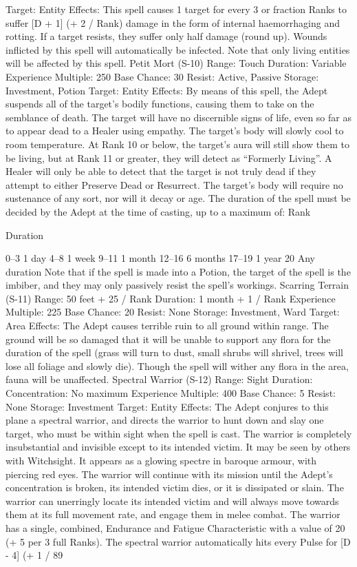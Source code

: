 \documentclass[a4paper]{article}
\begin{document}
\begin{multicols}{3}
Target: Entity
Effects: This spell causes 1 target for every 3 or
fraction Ranks to suffer [D + 1] (+ 2 / Rank) damage in the form of internal haemorrhaging and
rotting. If a target resists, they suffer only half
damage (round up). Wounds inflicted by this spell
will automatically be infected.
Note that only living entities will be affected by
this spell.
Petit Mort (S-10)
Range: Touch
Duration: Variable
Experience Multiple: 250
Base Chance: 30%
Resist: Active, Passive
Storage: Investment, Potion
Target: Entity
Effects: By means of this spell, the Adept suspends
all of the target’s bodily functions, causing them to
take on the semblance of death. The target will
have no discernible signs of life, even so far as to
appear dead to a Healer using empathy. The target’s body will slowly cool to room temperature.
At Rank 10 or below, the target’s aura will still
show them to be living, but at Rank 11 or greater,
they will detect as “Formerly Living”. A Healer
will only be able to detect that the target is not
truly dead if they attempt to either Preserve Dead
or Resurrect. The target’s body will require no
sustenance of any sort, nor will it decay or age. The
duration of the spell must be decided by the Adept
at the time of casting, up to a maximum of:
Rank

Duration

0–3
1 day
4–8
1 week
9–11
1 month
12–16 6 months
17–19 1 year
20
Any duration
Note that if the spell is made into a Potion, the
target of the spell is the imbiber, and they may only
passively resist the spell’s workings.
Scarring Terrain (S-11)
Range: 50 feet + 25 / Rank
Duration: 1 month + 1 / Rank
Experience Multiple: 225
Base Chance: 20%
Resist: None
Storage: Investment, Ward
Target: Area
Effects: The Adept causes terrible ruin to all
ground within range. The ground will be so damaged that it will be unable to support any flora for
the duration of the spell (grass will turn to dust,
small shrubs will shrivel, trees will lose all foliage
and slowly die). Though the spell will wither any
flora in the area, fauna will be unaffected.
Spectral Warrior (S-12)
Range: Sight
Duration: Concentration: No maximum
Experience Multiple: 400
Base Chance: 5%
Resist: None
Storage: Investment
Target: Entity
Effects: The Adept conjures to this plane a spectral
warrior, and directs the warrior to hunt down and
slay one target, who must be within sight when the
spell is cast. The warrior is completely insubstantial and invisible except to its intended victim. It
may be seen by others with Witchsight. It appears
as a glowing spectre in baroque armour, with piercing red eyes. The warrior will continue with its
mission until the Adept’s concentration is broken,
its intended victim dies, or it is dissipated or slain.
The warrior can unerringly locate its intended
victim and will always move towards them at its
full movement rate, and engage them in melee
combat. The warrior has a single, combined, Endurance and Fatigue Characteristic with a value of
20 (+ 5 per 3 full Ranks). The spectral warrior
automatically hits every Pulse for [D - 4] (+ 1 /
89


\end{multicols}
\end{document}
